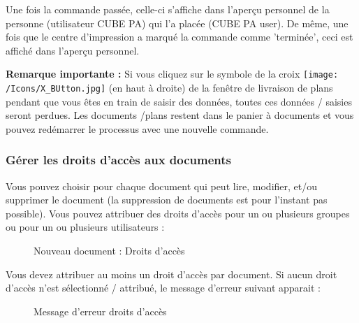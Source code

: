 \vspace{\baselineskip}

Une fois la commande passée, celle-ci s'affiche dans l'aperçu personnel de la personne (utilisateur CUBE PA) qui l'a placée (CUBE PA user). De même, une fois que le centre d'impression a marqué la commande comme 'terminée', ceci est affiché dans l'aperçu personnel.

\vspace{\baselineskip}

\textbf{Remarque importante :} Si vous cliquez sur le symbole de la croix \texttt{[image: /Icons/X\_BUtton.jpg]} (en haut à droite) de la fenêtre de livraison de plans pendant que vous êtes en train de saisir des données, toutes ces données / saisies seront perdues. Les documents /plans restent dans le panier à documents et vous pouvez redémarrer le processus avec une nouvelle commande.

\subsubsection{Gérer les droits d'accès aux documents}
\label{bkm:Ref442869495}

Vous pouvez choisir pour chaque document qui peut lire, modifier, et/ou supprimer le document (la suppression de documents est pour l'instant pas possible). Vous pouvez attribuer des droits d'accès pour un ou plusieurs groupes ou pour un ou plusieurs utilisateurs :

\begin{figure}[H]
\caption{Nouveau document : Droits d'accès}
\end{figure}

Vous devez attribuer au moins un droit d'accès par document. Si aucun droit d'accès n'est sélectionné / attribué, le message d'erreur suivant apparait :

\begin{figure}[H]
\caption{Message d'erreur droits d'accès}
\end{figure}

